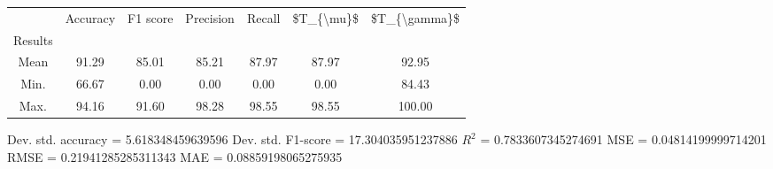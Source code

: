 \begin{tabular}{|c|c|c|c|c|c|c|}
\toprule
{} &  Accuracy &  F1 score &  Precision &  Recall &  \$T\_\{\textbackslash mu\}\$ &  \$T\_\{\textbackslash gamma\}\$ \\
Results &           &           &            &         &            &               \\
\hline
Mean    &     91.29 &     85.01 &      85.21 &   87.97 &      87.97 &         92.95 \\
Min.    &     66.67 &      0.00 &       0.00 &    0.00 &       0.00 &         84.43 \\
Max.    &     94.16 &     91.60 &      98.28 &   98.55 &      98.55 &        100.00 \\
\bottomrule
\end{tabular}

 Dev. std. accuracy = 5.618348459639596
 Dev. std. F1-score = 17.304035951237886
 $R^2$ = 0.7833607345274691
 MSE = 0.04814199999714201
 RMSE = 0.21941285285311343
 MAE = 0.08859198065275935